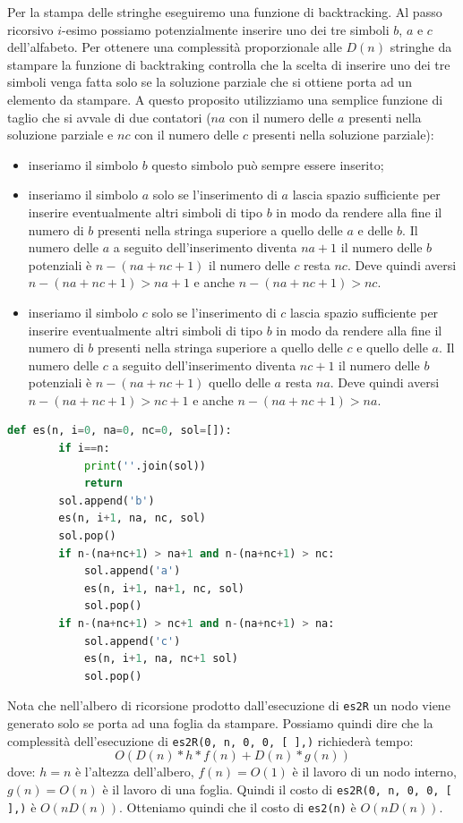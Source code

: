 Per la stampa delle stringhe eseguiremo una funzione di backtracking. Al passo ricorsivo $i$-esimo possiamo potenzialmente inserire uno dei tre simboli $b$, $a$ e $c$ dell’alfabeto. Per ottenere una complessità proporzionale alle $D(n)$ stringhe da stampare la funzione di backtraking controlla che la scelta di inserire uno dei tre simboli venga fatta solo se la soluzione parziale che si ottiene porta ad un elemento da stampare. A questo proposito utilizziamo una semplice funzione di taglio che si avvale di due contatori ($na$ con il numero delle $a$ presenti nella soluzione parziale e $nc$ con il numero delle $c$ presenti nella soluzione parziale):
\begin{itemize}
    \item inseriamo il simbolo $b$ questo simbolo può sempre essere inserito;
    \item inseriamo il simbolo $a$ solo se l’inserimento di $a$ lascia spazio sufficiente per inserire eventualmente altri simboli di tipo $b$ in modo da rendere alla fine il numero di $b$ presenti nella stringa superiore a quello delle $a$ e delle $b$. Il numero delle $a$ a seguito dell’inserimento diventa $na+1$ il numero delle $b$ potenziali è $n-(na+nc+1)$ il numero delle $c$ resta $nc$. Deve quindi aversi $n-(na + nc + 1) > na +1$ e anche $n - (na + nc + 1) > nc$.
    \item inseriamo il simbolo $c$ solo se l’inserimento di $c$ lascia spazio sufficiente per inserire eventualmente altri simboli di tipo $b$ in modo da rendere alla fine il numero di $b$ presenti nella stringa superiore a quello delle $c$ e quello delle $a$. Il numero delle $c$ a seguito dell’inserimento diventa $nc + 1$ il numero delle $b$ potenziali è $n-  (na + nc + 1)$ quello delle $a$ resta $na$. Deve quindi aversi $n - (na + nc + 1) > nc +1$ e anche $n - (na + nc + 1) > na$.
\end{itemize}

\begin{lstlisting}[language=Python]
    def es(n, i=0, na=0, nc=0, sol=[]):
        if i==n:
            print(''.join(sol))
            return
        sol.append('b')
        es(n, i+1, na, nc, sol)
        sol.pop()
        if n-(na+nc+1) > na+1 and n-(na+nc+1) > nc:
            sol.append('a')
            es(n, i+1, na+1, nc, sol)
            sol.pop()
        if n-(na+nc+1) > nc+1 and n-(na+nc+1) > na:
            sol.append('c')
            es(n, i+1, na, nc+1 sol)
            sol.pop()
\end{lstlisting}
Nota che nell’albero di ricorsione prodotto dall’esecuzione di \verb|es2R| un nodo viene generato solo se porta ad una foglia da stampare. Possiamo quindi dire che la complessità dell’esecuzione di \verb|es2R(0, n, 0, 0, [ ],)| richiederà tempo:
\begin{equation*}
    O(D(n) * h * f(n) + D(n) * g(n))
\end{equation*}
dove: $h = n$ è l’altezza dell’albero, $f(n) = O(1)$ è il lavoro di un nodo interno, $g(n) = O(n)$ è il lavoro di una foglia. Quindi il costo di \verb|es2R(0, n, 0, 0, [ ],)| è $O(nD(n))$. Otteniamo quindi che il costo di \verb|es2(n)| è $O(nD(n))$.

